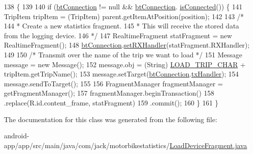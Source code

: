 \begin{DoxyCode}
138                                                                                          \{
139 
140             \textcolor{keywordflow}{if} (\hyperlink{class_android_app_1_1_load_device_fragment_a245147c7d3683cf1556680a382f328a9}{btConnection} != null && \hyperlink{class_android_app_1_1_load_device_fragment_a245147c7d3683cf1556680a382f328a9}{btConnection}.
      \hyperlink{class_android_app_1_1_b_t_connection_a1c91fcddfe9f3b69cd0141742103191a}{isConnected}()) \{
141                 TripItem tripItem = (TripItem) parent.getItemAtPosition(position);
142 
143                 \textcolor{comment}{/*}
144 \textcolor{comment}{                 * Create a new statistics fragment.}
145 \textcolor{comment}{                 * This will receive the stored data from the logging device.}
146 \textcolor{comment}{                 */}
147                 RealtimeFragment statFragment = \textcolor{keyword}{new} RealtimeFragment();
148                 \hyperlink{class_android_app_1_1_load_device_fragment_a245147c7d3683cf1556680a382f328a9}{btConnection}.\hyperlink{class_android_app_1_1_b_t_connection_a41022747db3c5a8bf0f4ddbc7bf32a3d}{setRXHandler}(statFragment.RXHandler);
149 
150                 \textcolor{comment}{/* Transmit over the name of the trip we want to load */}
151                 Message message = \textcolor{keyword}{new} Message();
152                 message.obj = (String) \hyperlink{class_android_app_1_1_load_device_fragment_afdfe423809d2267938f21eb4c5501653}{LOAD\_TRIP\_CHAR} + tripItem.getTripName();
153                 message.setTarget(\hyperlink{class_android_app_1_1_load_device_fragment_a245147c7d3683cf1556680a382f328a9}{btConnection}.\hyperlink{class_android_app_1_1_b_t_connection_a3236a74297d91f15dd63efc66f03a821}{txHandler});
154                 message.sendToTarget();
155 
156                 FragmentManager fragmentManager = getFragmentManager();
157                 fragmentManager.beginTransaction()
158                         .replace(R.id.content\_frame, statFragment)
159                         .commit();
160             \}
161         \}
\end{DoxyCode}


The documentation for this class was generated from the following file\+:\begin{DoxyCompactItemize}
\item 
android-\/app/app/src/main/java/com/jack/motorbikestatistics/\hyperlink{_load_device_fragment_8java}{Load\+Device\+Fragment.\+java}\end{DoxyCompactItemize}
